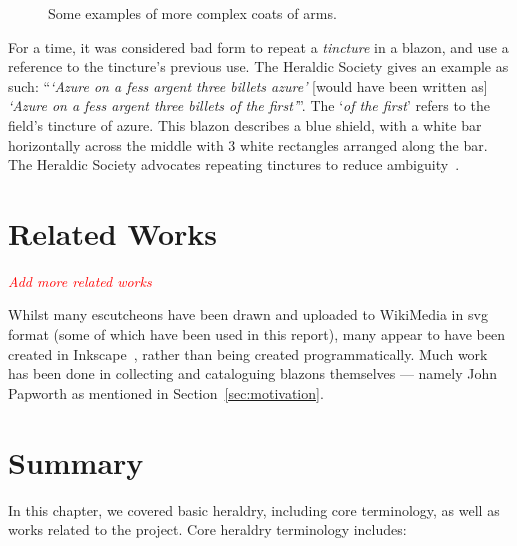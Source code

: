 \documentclass[nobib, a4paper, twoside, justified]{tufte-book}
\makeatletter
\newcommand{\svg}{\gls{svg}\@\xspace}
\newcommand{\blazon}{\gls{blazon}\@\xspace}
\newcommand{\blazons}{\glspl{blazon}\@\xspace}
\newcommand{\todo}[1]{{\noindent\textcolor{Red}{\textit{\quad#1}}\par}}
\makeatother
\begin{document}
\begin{figure*}[h]
  \qquad
  \caption{Some examples of more complex coats of arms.}\label{fig:complex_shields}
\end{figure*}

For a time, it was considered bad form to repeat a \textit{tincture} in a \blazon, and use a
reference to the tincture's previous use. The Heraldic Society gives an example as such:
``\textit{`Azure on a fess argent three billets azure'} [would have been written as] \textit{`Azure
on a fess argent three billets of the first'}''. The `\textit{of the first}' refers to the field's
tincture of azure. This \blazon describes a blue shield, with a white bar horizontally across the
middle with 3 white rectangles arranged along the bar. The Heraldic Society advocates repeating
tinctures to reduce ambiguity~\autocite{blazon_in_coa}.

\section{Related Works}%
\label{sec:related_works}

\todo{Add more related works}

Whilst many escutcheons have been drawn and uploaded to WikiMedia in
\svg~\autocite{ferraiolo2000scalable} format (some of which have been used in this report), many
appear to have been created in Inkscape~\autocite{inkscape}, rather than being created
programmatically. Much work has been done in collecting and cataloguing \blazons themselves ---
namely John Papworth as mentioned in Section~\ref{sec:motivation}.

\section{Summary}%
\label{sec:background_summary}

In this chapter, we covered basic heraldry, including core terminology, as well as works related to
the project. Core heraldry terminology includes:
\end{document}
